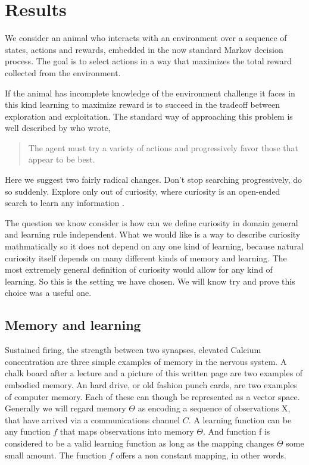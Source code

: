\section{Results} 
We consider an animal who interacts with an environment over a sequence of states, actions and rewards, embedded in the now standard Markov decision process. The goal is to select actions in a way that maximizes the total reward collected from the environment. 


If the animal has incomplete knowledge of the environment challenge it faces in this kind learning to maximize reward is to succeed in the tradeoff between exploration and exploitation. The standard way of approaching this problem is well described by \cite{Sutton2018} who wrote,

\begin{quotation}
	The agent must try a variety of actions and progressively favor those that appear to be best. 	
\end{quotation}

Here we suggest two fairly radical changes. Don’t stop searching progressively, do so suddenly. Explore only out of curiosity, where curiosity is an open-ended search to learn any information \citep{Kidd2015}. 


The question we know consider is how can we define curiosity in domain general and learning rule independent. What we would like is a way to describe curiosity mathmatically so it does not depend on any one kind of learning, because natural curiosity itself depends on many different kinds of memory and learning. The most extremely general definition of curiosity would allow for any kind of learning. So this is the setting we have chosen. We will know try and prove this choice was a useful one.

\subsection{Memory and learning} 
Sustained firing, the strength between two synapses, elevated Calcium concentration are three simple examples of memory in the nervous system. A chalk board after a lecture and a picture of this written page are two examples of embodied memory. An hard drive, or old fashion punch cards, are two examples of computer memory. Each of these can though be represented as a vector space. Generally we will regard memory $\Theta$ as encoding a sequence of observations X, that have arrived via a communications channel $C$. A learning function can be any function $f$ that maps observations into memory $\Theta$. And function f is considered to be a valid learning function as long as the mapping changes $\Theta$ some small amount. The function $f$ offers a non constant mapping, in other words.

